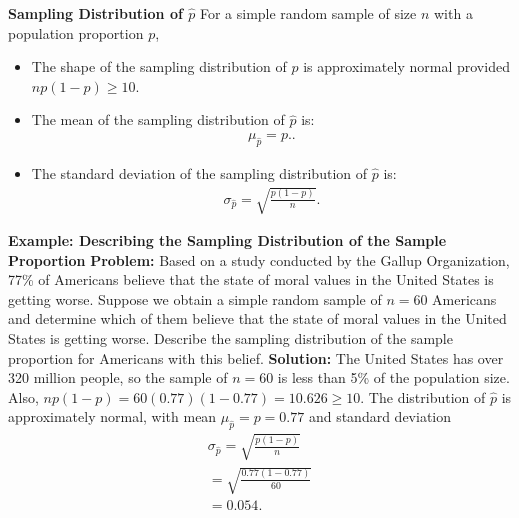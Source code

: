 \documentclass{report}
\begin{document}
        \bigbreak \noindent \bigbreak \noindent 
        \textbf{Sampling Distribution of $\hat{p} $}
        \bigbreak \noindent 
        For a simple random sample of size $n$ with a population proportion $p$, 
        \begin{itemize}
            \item The shape of the sampling distribution of $\hat{p}$ is approximately normal provided $np(1-p) \geq 10$.
            \item The mean of the sampling distribution of $\hat{p}$ is:
                \begin{align*}
                    \mu_{\hat{p}} = p.
                .\end{align*}
            \item The standard deviation of the sampling distribution of $\hat{p}$ is:
                \begin{align*}
                    \sigma_{\hat{p}} = \sqrt{\frac{p(1-p)}{n}}
                .\end{align*}
        \end{itemize}
        \bigbreak \noindent 

        \pagebreak \bigbreak \noindent 
        \bigbreak \noindent 
        \begin{mdframed}
          \textbf{Example: Describing the Sampling Distribution of the Sample Proportion}
          \bigbreak \noindent 
          \textbf{Problem:}
          \bigbreak \noindent 
          Based on a study conducted by the Gallup Organization, 77\% of Americans believe that the state of moral values in the United States is getting worse. Suppose we obtain a simple random sample of $n=60$ Americans and determine which of them believe that the state of moral values in the United States is getting worse. Describe the sampling distribution of the sample proportion for Americans with this belief.
          \bigbreak \noindent 
          \textbf{Solution:}
          \bigbreak \noindent 
          The United States has over 320 million people, so the sample of $n=60$ is less than 5\% of the population size. Also, $np(1-p)=60(0.77)(1-0.77)=10.626\geq 10$. The distribution of $\hat{p}$ is approximately normal, with mean $\mu_{\hat{p}}=p=0.77$ and standard deviation
          \begin{align*}
              \sigma_{\hat{p}}=\sqrt{\frac{p(1-p)}{n}}\\
              =\sqrt{\frac{0.77(1-0.77)}{60}}\\
              =0.054
          .\end{align*}
        \end{mdframed}
\end{document}
